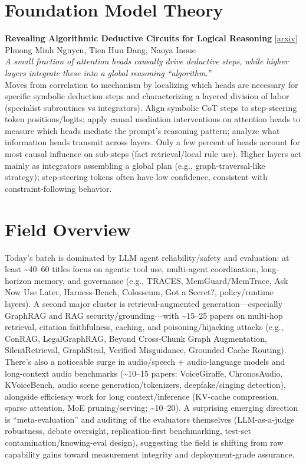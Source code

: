 \documentclass[12pt,letterpaper]{article}
\begin{document}
\medskip


\section*{Foundation Model Theory}

{\small\textbf{Revealing Algorithmic Deductive Circuits for Logical Reasoning}} {\scriptsize[\href{https://arxiv.org/abs/2605.27824}{arxiv}]}\\
{\scriptsize Phuong Minh Nguyen, Tien Huu Dang, Naoya Inoue}\\

{\small\textit{A small fraction of attention heads causally drive deductive steps, while higher layers integrate these into a global reasoning ``algorithm.''}}\\[1pt]
{\footnotesize Moves from correlation to mechanism by localizing which heads are necessary for specific symbolic deduction steps and characterizing a layered division of labor (specialist subroutines vs integrators). Align symbolic CoT steps to step-steering token positions/logits; apply causal mediation interventions on attention heads to measure which heads mediate the prompt's reasoning pattern; analyze what information heads transmit across layers. Only a few percent of heads account for most causal influence on sub-steps (fact retrieval/local rule use). Higher layers act mainly as integrators assembling a global plan (e.g., graph-traversal-like strategy); step-steering tokens often have low confidence, consistent with constraint-following behavior.}

\medskip



\section*{Field Overview}
{\footnotesize Today's batch is dominated by LLM agent reliability/safety and evaluation: at least \textasciitilde{}40--60 titles focus on agentic tool use, multi-agent coordination, long-horizon memory, and governance (e.g., TRACES, MemGuard/MemTrace, Ask Now Use Later, Harness-Bench, Colosseum, Got a Secret?, policy/runtime layers). A second major cluster is retrieval-augmented generation---especially GraphRAG and RAG security/grounding---with \textasciitilde{}15--25 papers on multi-hop retrieval, citation faithfulness, caching, and poisoning/hijacking attacks (e.g., ConRAG, LegalGraphRAG, Beyond Cross-Chunk Graph Augmentation, SilentRetrieval, GraphSteal, Verified Misguidance, Grounded Cache Routing). There's also a noticeable surge in audio/speech + audio-language models and long-context audio benchmarks (\textasciitilde{}10--15 papers: VoiceGiraffe, ChronosAudio, KVoiceBench, audio scene generation/tokenizers, deepfake/singing detection), alongside efficiency work for long context/inference (KV-cache compression, sparse attention, MoE pruning/serving; \textasciitilde{}10--20). A surprising emerging direction is ``meta-evaluation'' and auditing of the evaluators themselves (LLM-as-a-judge robustness, debate oversight, replication-first benchmarking, test-set contamination/knowing-eval design), suggesting the field is shifting from raw capability gains toward measurement integrity and deployment-grade assurance.}
\end{document}
